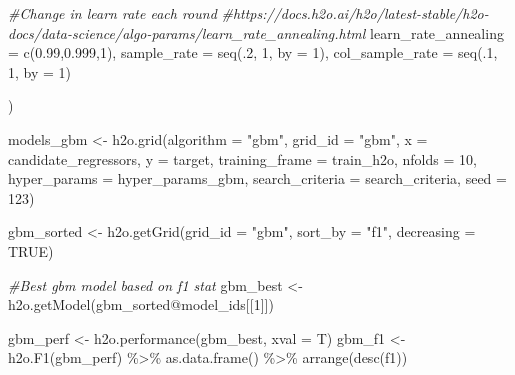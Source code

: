 \documentclass[
]{article}
\newenvironment{Shaded}{\begin{snugshade}}{\end{snugshade}}
\newcommand{\AttributeTok}[1]{\textcolor[rgb]{0.77,0.63,0.00}{#1}}
\newcommand{\CommentTok}[1]{\textcolor[rgb]{0.56,0.35,0.01}{\textit{#1}}}
\newcommand{\ConstantTok}[1]{\textcolor[rgb]{0.00,0.00,0.00}{#1}}
\newcommand{\DecValTok}[1]{\textcolor[rgb]{0.00,0.00,0.81}{#1}}
\newcommand{\FloatTok}[1]{\textcolor[rgb]{0.00,0.00,0.81}{#1}}
\newcommand{\FunctionTok}[1]{\textcolor[rgb]{0.00,0.00,0.00}{#1}}
\newcommand{\NormalTok}[1]{#1}
\newcommand{\OtherTok}[1]{\textcolor[rgb]{0.56,0.35,0.01}{#1}}
\newcommand{\SpecialCharTok}[1]{\textcolor[rgb]{0.00,0.00,0.00}{#1}}
\newcommand{\StringTok}[1]{\textcolor[rgb]{0.31,0.60,0.02}{#1}}
\begin{document}
\begin{Shaded}
\begin{Highlighting}[]
                         \CommentTok{\#Change in learn rate each round}
                         \CommentTok{\#https://docs.h2o.ai/h2o/latest{-}stable/h2o{-}docs/data{-}science/algo{-}params/learn\_rate\_annealing.html}
                         \AttributeTok{learn\_rate\_annealing =} \FunctionTok{c}\NormalTok{(}\FloatTok{0.99}\NormalTok{,}\FloatTok{0.999}\NormalTok{,}\DecValTok{1}\NormalTok{),}
                         \AttributeTok{sample\_rate =} \FunctionTok{seq}\NormalTok{(.}\DecValTok{2}\NormalTok{, }\DecValTok{1}\NormalTok{, }\AttributeTok{by =} \DecValTok{1}\NormalTok{),}
                         \AttributeTok{col\_sample\_rate =} \FunctionTok{seq}\NormalTok{(.}\DecValTok{1}\NormalTok{, }\DecValTok{1}\NormalTok{, }\AttributeTok{by =} \DecValTok{1}\NormalTok{)}
                         
\NormalTok{)}


\NormalTok{models\_gbm }\OtherTok{\textless{}{-}} \FunctionTok{h2o.grid}\NormalTok{(}\AttributeTok{algorithm =} \StringTok{"gbm"}\NormalTok{, }\AttributeTok{grid\_id =} \StringTok{"gbm"}\NormalTok{,}
                       \AttributeTok{x =}\NormalTok{ candidate\_regressors, }
                       \AttributeTok{y =}\NormalTok{ target,}
                       \AttributeTok{training\_frame =}\NormalTok{ train\_h2o, }
                       \AttributeTok{nfolds =} \DecValTok{10}\NormalTok{, }
                       \AttributeTok{hyper\_params =}\NormalTok{ hyper\_params\_gbm, }
                       \AttributeTok{search\_criteria =}\NormalTok{ search\_criteria, }
                       \AttributeTok{seed =} \DecValTok{123}\NormalTok{)}

\NormalTok{gbm\_sorted }\OtherTok{\textless{}{-}} \FunctionTok{h2o.getGrid}\NormalTok{(}\AttributeTok{grid\_id =} \StringTok{"gbm"}\NormalTok{, }\AttributeTok{sort\_by =} \StringTok{"f1"}\NormalTok{, }\AttributeTok{decreasing =} \ConstantTok{TRUE}\NormalTok{)}

\CommentTok{\#Best gbm model based on f1 stat}
\NormalTok{gbm\_best }\OtherTok{\textless{}{-}} \FunctionTok{h2o.getModel}\NormalTok{(gbm\_sorted}\SpecialCharTok{@}\NormalTok{model\_ids[[}\DecValTok{1}\NormalTok{]])}

\NormalTok{gbm\_perf }\OtherTok{\textless{}{-}} \FunctionTok{h2o.performance}\NormalTok{(gbm\_best, }\AttributeTok{xval =}\NormalTok{ T)}
\NormalTok{gbm\_f1 }\OtherTok{\textless{}{-}} \FunctionTok{h2o.F1}\NormalTok{(gbm\_perf) }\SpecialCharTok{\%\textgreater{}\%}
  \FunctionTok{as.data.frame}\NormalTok{() }\SpecialCharTok{\%\textgreater{}\%}
  \FunctionTok{arrange}\NormalTok{(}\FunctionTok{desc}\NormalTok{(f1)) }


\end{Highlighting}
\end{Shaded}
\end{document}
